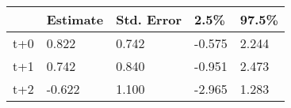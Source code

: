 \begin{tabular}{lllll}
  \toprule
  & Estimate & Std. Error & 2.5\% & 97.5\% \\ 
  \midrule
t+0 & 0.822 & 0.742 & -0.575 & 2.244 \\ 
  t+1 & 0.742 & 0.840 & -0.951 & 2.473 \\ 
  t+2 & -0.622 & 1.100 & -2.965 & 1.283 \\ 
   \bottomrule
\end{tabular}
